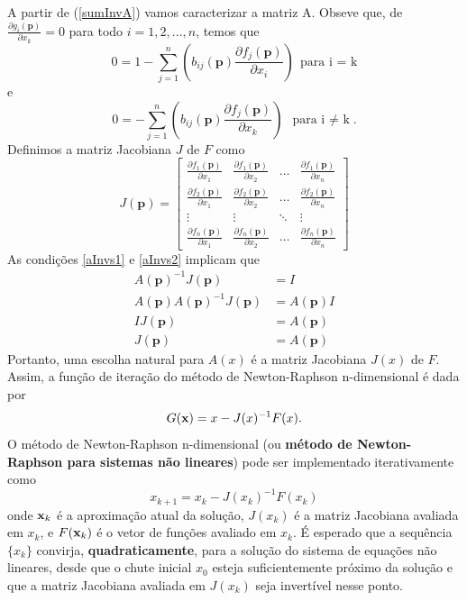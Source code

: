 A partir de (\ref{sumInvA}) vamos caracterizar a matriz A. Obseve que, de \( \frac{\partial g_i(\mathbf{p})}{\partial x_k} = 0 \) para todo $ i = 1,2, \ldots, n$, temos que
\begin{equation}\label{aInvs1}
    0 = 1 - \sum_{j=1}^{n} \left( b_{ij}(\mathbf{p}) \frac{\partial f_j(\mathbf{p})}{\partial x_i} \right) \ \ \text{para i = k}
\end{equation}
e
\begin{equation}\label{aInvs2}
    0 = - \sum_{j=1}^{n} \left( b_{ij}(\mathbf{p}) \frac{\partial f_j(\mathbf{p})}{\partial x_k} \right)\ \ \text{para i $\neq$ k}.
\end{equation}
Definimos a matriz Jacobiana \(J\) de \(F\) como
\begin{equation}
    J(\mathbf{p}) =
    \begin{bmatrix}
        \frac{\partial f_1(\mathbf{p})}{\partial x_1} & \frac{\partial f_1(\mathbf{p})}{\partial x_2} & \ldots & \frac{\partial f_1(\mathbf{p})}{\partial x_n} \\
        \frac{\partial f_2(\mathbf{p})}{\partial x_1} & \frac{\partial f_2(\mathbf{p})}{\partial x_2} & \ldots & \frac{\partial f_2(\mathbf{p})}{\partial x_n} \\
        \vdots & \vdots & \ddots & \vdots \\
        \frac{\partial f_n(\mathbf{p})}{\partial x_1} & \frac{\partial f_n(\mathbf{p})}{\partial x_2} & \ldots & \frac{\partial f_n(\mathbf{p})}{\partial x_n}
    \end{bmatrix}
\end{equation}
As condições \ref{aInvs1} e \ref{aInvs2} implicam que
\begin{align*}
    A(\mathbf{p})^{-1} J(\mathbf{p}) &= I \\[6pt]
    A(\mathbf{p}) A(\mathbf{p})^{-1} J(\mathbf{p}) &= A(\mathbf{p}) I \\[6pt]
    I J(\mathbf{p}) &= A(\mathbf{p}) \\[6pt]
    J(\mathbf{p}) &= A(\mathbf{p})
\end{align*}
Portanto, uma escolha natural para \(A(x)\) é a matriz Jacobiana \(J(x)\) de \(F\). Assim, a função de iteração do método de Newton-Raphson n-dimensional é dada por
\begin{equation}
    G(\textbf{x}) = x - J(x)^{-1} F(x).
\end{equation}
O método de Newton-Raphson n-dimensional (ou \textbf{método de Newton-Raphson para sistemas não lineares}) pode ser implementado iterativamente como
\begin{equation}\label{seqIterNRndim}
    x_{k+1} = x_k - J(x_k)^{-1} F(x_k)
\end{equation}
onde \(\textbf{x}_k\) é a aproximação atual da solução, \(J(x_k)\) é a matriz Jacobiana avaliada em \(x_k\), e \(F(\textbf{x}_k)\) é o vetor de funções avaliado em \(x_k\). É esperado que a sequência \(\{x_k\}\) convirja, \textbf{quadraticamente}, para a solução do sistema de equações não lineares, desde que o chute inicial \(x_0\) esteja suficientemente próximo da solução e que a matriz Jacobiana avaliada em \(J(x_k)\) seja invertível nesse ponto.

